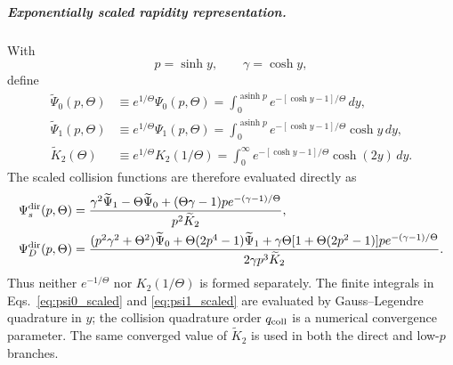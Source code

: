 \documentclass[11pt]{article}
\begin{document}
\subparagraph{Exponentially scaled rapidity representation.}
With
\begin{equation}
 p=\sinh y,\qquad \gamma=\cosh y,
 \label{eq:rapidity_substitution}
\end{equation}
define
\begin{align}
 \widetilde\Psi_0(p,\Theta)
 &\equiv e^{1/\Theta}\Psi_0(p,\Theta)
 =\int_0^{\operatorname{asinh}p}
   e^{-[\cosh y-1]/\Theta}\,dy,
 \label{eq:psi0_scaled}\\
 \widetilde\Psi_1(p,\Theta)
 &\equiv e^{1/\Theta}\Psi_1(p,\Theta)
 =\int_0^{\operatorname{asinh}p}
   e^{-[\cosh y-1]/\Theta}\cosh y\,dy,
 \label{eq:psi1_scaled}\\
 \widetilde K_2(\Theta)
 &\equiv e^{1/\Theta}K_2(1/\Theta)
 =\int_0^\infty
   e^{-[\cosh y-1]/\Theta}\cosh(2y)\,dy.
 \label{eq:k2_scaled}
\end{align}
The scaled collision functions are therefore evaluated directly as
\begin{align}
 \Psi_s^{\rm dir}(p,\Theta)
 &=\frac{
   \gamma^2\widetilde\Psi_1-\Theta\widetilde\Psi_0
   +(\Theta\gamma-1)p e^{-(\gamma-1)/\Theta}}
  {p^2\widetilde K_2},
 \label{eq:psis_scaled_direct}\\
 \Psi_D^{\rm dir}(p,\Theta)
 &=\frac{
  (p^2\gamma^2+\Theta^2)\widetilde\Psi_0
  +\Theta(2p^4-1)\widetilde\Psi_1
  +\gamma\Theta[1+\Theta(2p^2-1)]p e^{-(\gamma-1)/\Theta}}
  {2\gamma p^3\widetilde K_2}.
 \label{eq:psid_scaled_direct}
\end{align}
Thus neither $e^{-1/\Theta}$ nor $K_2(1/\Theta)$ is formed separately.  The finite
integrals in Eqs.~\eqref{eq:psi0_scaled} and \eqref{eq:psi1_scaled} are evaluated by
Gauss--Legendre quadrature in $y$; the collision quadrature order $q_{\rm coll}$ is a
numerical convergence parameter.  The same converged value of $\widetilde K_2$ is used
in both the direct and low-$p$ branches.
\end{document}
